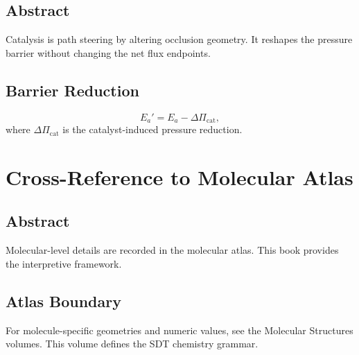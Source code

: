 \documentclass[12pt]{book}
\begin{document}
\section*{Abstract}
Catalysis is path steering by altering occlusion geometry. It reshapes the pressure barrier without
changing the net flux endpoints.

\section{Barrier Reduction}
\begin{equation}
E_a' = E_a - \Delta \Pi_{\text{cat}},
\end{equation}
where $\Delta \Pi_{\text{cat}}$ is the catalyst-induced pressure reduction.

\chapter{Cross-Reference to Molecular Atlas}

\section*{Abstract}
Molecular-level details are recorded in the molecular atlas. This book provides the interpretive
framework.

\section{Atlas Boundary}
For molecule-specific geometries and numeric values, see the Molecular Structures volumes. This volume
defines the SDT chemistry grammar.
\end{document}

